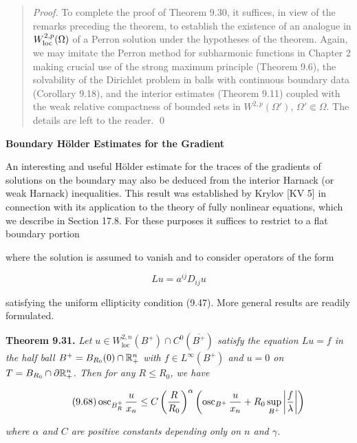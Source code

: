 \begin{quote}
\emph{Proof.} To complete the proof of Theorem 9.30, it suffices, in view of the remarks preceding the theorem, to establish the existence of an analogue in $W^{2,p}_{\mathrm{loc}}(\Omega)$ of a Perron solution under the hypotheses of the theorem. Again, we may imitate the Perron method for subharmonic functions in Chapter 2 making crucial use of the strong maximum principle (Theorem 9.6), the solvability of the Dirichlet problem in balls with continuous boundary data (Corollary 9.18), and the interior estimates (Theorem 9.11) coupled with the weak relative compactness of bounded sets in $W^{2,p}(\Omega')$, $\Omega'\Subset\Omega$. The details are left to the reader. \qed
\end{quote}

\textbf{Boundary Hölder Estimates for the Gradient}

An interesting and useful Hölder estimate for the traces of the gradients of solutions on the boundary may also be deduced from the interior Harnack (or weak Harnack) inequalities. This result was established by Krylov [KV 5] in connection with its application to the theory of fully nonlinear equations, which we describe in Section 17.8. For these purposes it suffices to restrict to a flat boundary portion


where the solution is assumed to vanish and to consider operators of the form

\[
Lu = a^{ij} D_{ij}u
\]

satisfying the uniform ellipticity condition (9.47). More general results are readily formulated.

\medskip

\noindent\textbf{Theorem 9.31.} \textit{Let $u \in W^{2,n}_{\mathrm{loc}}(B^+) \cap C^0(\overline{B^+})$ satisfy the equation $Lu = f$ in the half ball $B^+ = B_{R_0}(0) \cap \mathbb{R}^n_+$ with $f \in L^\infty(B^+)$ and $u = 0$ on $T = B_{R_0} \cap \partial \mathbb{R}^n_+$. Then for any $R \leq R_0$, we have}

\begin{equation}\tag{9.68}
\operatorname{osc}_{B_R^+} \frac{u}{x_n} \leq C \left(\frac{R}{R_0}\right)^{\alpha}
\left(\operatorname{osc}_{B^+} \frac{u}{x_n} + R_0 \sup_{B^+} \left|\frac{f}{\lambda}\right|\right)
\end{equation}

\noindent\textit{where $\alpha$ and $C$ are positive constants depending only on $n$ and $\gamma$.}

\medskip

